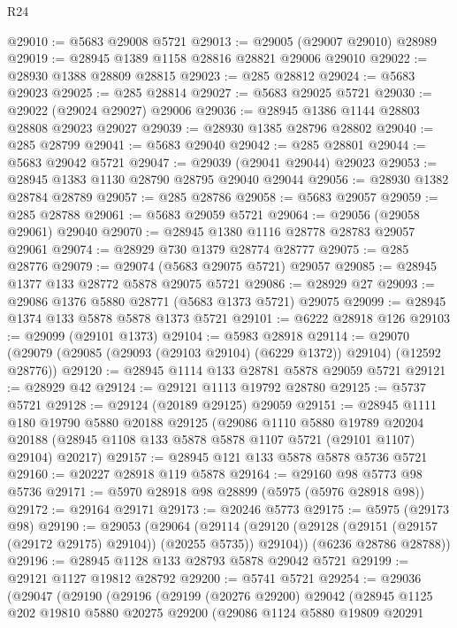 \begin{lexlean}{R24}
\begin{coremodule}
@29010 := @5683 @29008 @5721
@29013 := @29005 (@29007 @29010) @28989
@29019 := @28945 @1389 @1158 @28816 @28821 @29006 @29010
@29022 := @28930 @1388 @28809 @28815
@29023 := @285 @28812
@29024 := @5683 @29023
@29025 := @285 @28814
@29027 := @5683 @29025 @5721
@29030 := @29022 (@29024 @29027) @29006
@29036 := @28945 @1386 @1144 @28803 @28808 @29023 @29027
@29039 := @28930 @1385 @28796 @28802
@29040 := @285 @28799
@29041 := @5683 @29040
@29042 := @285 @28801
@29044 := @5683 @29042 @5721
@29047 := @29039 (@29041 @29044) @29023
@29053 := @28945 @1383 @1130 @28790 @28795 @29040 @29044
@29056 := @28930 @1382 @28784 @28789
@29057 := @285 @28786
@29058 := @5683 @29057
@29059 := @285 @28788
@29061 := @5683 @29059 @5721
@29064 := @29056 (@29058 @29061) @29040
@29070 := @28945 @1380 @1116 @28778 @28783 @29057 @29061
@29074 := @28929 @730 @1379 @28774 @28777
@29075 := @285 @28776
@29079 := @29074 (@5683 @29075 @5721) @29057
@29085 := @28945 @1377 @133 @28772 @5878 @29075 @5721
@29086 := @28929 @27
@29093 := @29086 @1376 @5880 @28771 (@5683 @1373 @5721) @29075
@29099 := @28945 @1374 @133 @5878 @5878 @1373 @5721
@29101 := @6222 @28918 @126
@29103 := @29099 (@29101 @1373)
@29104 := @5983 @28918
@29114 := @29070 (@29079 (@29085 (@29093 (@29103 @29104) (@6229 @1372)) @29104) (@12592 @28776))
@29120 := @28945 @1114 @133 @28781 @5878 @29059 @5721
@29121 := @28929 @42
@29124 := @29121 @1113 @19792 @28780
@29125 := @5737 @5721
@29128 := @29124 (@20189 @29125) @29059
@29151 := @28945
    @1111
    @180
    @19790
    @5880
    @20188
    @29125
    (@29086
      @1110
      @5880
      @19789
      @20204
      @20188
      (@28945 @1108 @133 @5878 @5878 @1107 @5721 (@29101 @1107) @29104)
      @20217)
@29157 := @28945 @121 @133 @5878 @5878 @5736 @5721
@29160 := @20227 @28918 @119 @5878
@29164 := @29160 @98 @5773 @98 @5736
@29171 := @5970 @28918 @98 @28899 (@5975 (@5976 @28918 @98))
@29172 := @29164 @29171
@29173 := @20246 @5773
@29175 := @5975 (@29173 @98)
@29190 := @29053
    (@29064
      (@29114 (@29120 (@29128 (@29151 (@29157 (@29172 @29175) @29104)) (@20255 @5735)) @29104))
      (@6236 @28786 @28788))
@29196 := @28945 @1128 @133 @28793 @5878 @29042 @5721
@29199 := @29121 @1127 @19812 @28792
@29200 := @5741 @5721
@29254 := @29036
    (@29047
      (@29190
        (@29196
          (@29199
            (@20276 @29200)
            @29042
            (@28945
              @1125
              @202
              @19810
              @5880
              @20275
              @29200
              (@29086
                @1124
                @5880
                @19809
                @20291

\end{coremodule}
\end{lexlean}
